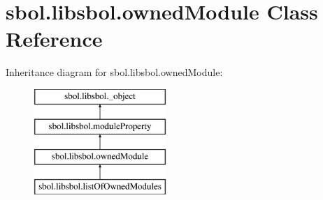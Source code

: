 \hypertarget{classsbol_1_1libsbol_1_1owned_module}{}\section{sbol.\+libsbol.\+owned\+Module Class Reference}
\label{classsbol_1_1libsbol_1_1owned_module}
Inheritance diagram for sbol.\+libsbol.\+owned\+Module\+:\begin{figure}[H]
\begin{center}
\leavevmode
\includegraphics[height=4.000000cm]{classsbol_1_1libsbol_1_1owned_module}
\end{center}
\end{figure}
